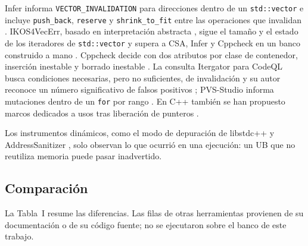 \documentclass[conference]{IEEEtran}
\newcommand{\code}[1]{\texttt{#1}}
\begin{document}
Infer informa \code{VECTOR\_INVALIDATION} para direcciones dentro de un \code{std::vector} e incluye \code{push\_back}, \code{reserve} y \code{shrink\_to\_fit} entre las operaciones que invalidan \cite{infer}. IKOS4VecErr, basado en interpretación abstracta \cite{cousot77}, sigue el tamaño y el estado de los iteradores de \code{std::vector} y supera a CSA, Infer y Cppcheck en un banco construido a mano \cite{liu25}. Cppcheck decide con dos atributos por clase de contenedor, inserción inestable y borrado inestable \cite{cppcheck}. La consulta Itergator para CodeQL busca condiciones necesarias, pero no suficientes, de invalidación y su autor reconoce un número significativo de falsos positivos \cite{higgs20}; PVS-Studio informa mutaciones dentro de un \code{for} por rango \cite{pvs}. En C++ también se han propuesto marcos dedicados a usos tras liberación de punteros \cite{teodorescu24}.

Los instrumentos dinámicos, como el modo de depuración de libstdc++ \cite{libstdcxx} y AddressSanitizer \cite{asan}, solo observan lo que ocurrió en una ejecución: un UB que no reutiliza memoria puede pasar inadvertido.

\subsection{Comparación}

La Tabla~I resume las diferencias. Las filas de otras herramientas provienen de su documentación o de su código fuente; no se ejecutaron sobre el banco de este trabajo.
\end{document}
